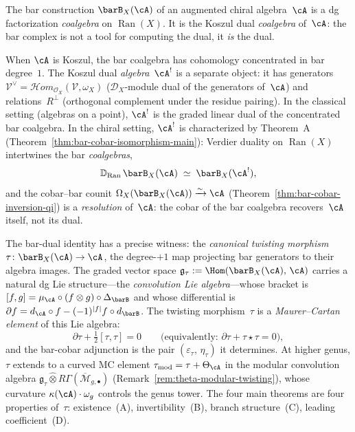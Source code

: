 \begin{convention}
\label{conv:bar-coalgebra-identity}
The bar construction $\barB_X(\cA)$ of an augmented chiral
algebra~$\cA$ is a dg factorization \emph{coalgebra} on
$\operatorname{Ran}(X)$.  It is the Koszul dual \emph{coalgebra}
of~$\cA$: the bar complex is not a tool for computing the dual,
it \emph{is} the dual.

When $\cA$ is Koszul, the bar coalgebra has cohomology concentrated
in bar degree~$1$.  The Koszul dual \emph{algebra}~$\cA^!$ is a
separate object: it has generators $\mathcal{V}^\vee =
\mathcal{H}om_{\mathcal{O}_X}(\mathcal{V}, \omega_X)$
($\mathcal{D}_X$-module dual of the generators of~$\cA$) and
relations~$R^\perp$ (orthogonal complement under the residue
pairing).  In the classical setting (algebras on a point),
$\cA^!$ is the graded linear dual of the concentrated bar
coalgebra.  In the chiral setting, $\cA^!$ is characterized by
Theorem~A (Theorem~\ref{thm:bar-cobar-isomorphism-main}):
Verdier duality on $\operatorname{Ran}(X)$ intertwines the bar
\emph{coalgebras},
\[
\mathbb{D}_{\operatorname{Ran}}\, \barB_X(\cA)
\;\simeq\; \barB_X(\cA^!),
\]
and the cobar--bar counit
$\Omega_X(\barB_X(\cA)) \xrightarrow{\sim} \cA$
(Theorem~\ref{thm:bar-cobar-inversion-qi})
is a \emph{resolution} of~$\cA$: the cobar of the bar coalgebra
recovers~$\cA$ itself, not its dual.

The bar-dual identity has a precise witness: the \emph{canonical
twisting morphism}
$\tau \colon \barB_X(\cA) \to \cA$,
the degree-$+1$ map projecting bar generators to their algebra
images.  The graded vector space
$\mathfrak{g}_\tau := \Hom(\barB_X(\cA),\, \cA)$ carries a
natural dg Lie structure---the \emph{convolution Lie algebra}---whose
bracket is $[f, g] = \mu_\cA \circ (f \otimes g) \circ
\Delta_{\barB}$ and whose differential is
$\partial f = d_\cA \circ f - (-1)^{|f|} f \circ d_{\barB}$.
The twisting morphism~$\tau$ is a \emph{Maurer--Cartan element}
of this Lie algebra:
\[
\partial\tau + \tfrac{1}{2}[\tau, \tau] = 0
\qquad
\bigl(\text{equivalently: } \partial\tau + \tau \star \tau = 0\bigr),
\]
and the bar-cobar adjunction is the pair
$(\varepsilon_\tau,\, \eta_\tau)$ it determines.
At higher genus, $\tau$ extends to a curved MC element
$\tau_{\mathrm{mod}} = \tau + \Theta_\cA$
in the modular convolution algebra
$\mathfrak{g}_\tau \widehat{\otimes} R\Gamma(\overline{\mathcal{M}}_{g,\bullet})$
(Remark~\ref{rem:theta-modular-twisting}), whose curvature
$\kappa(\cA)\cdot\omega_g$ controls the genus tower.
The four main theorems are four properties of~$\tau$:
existence~(A), invertibility~(B), branch structure~(C),
leading coefficient~(D).


\end{convention}
